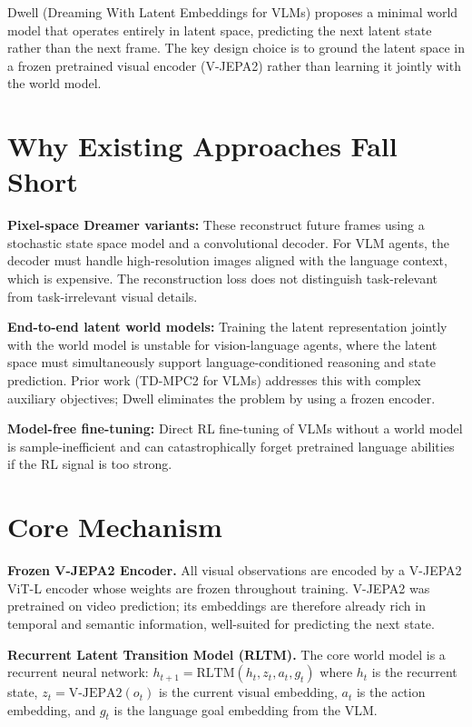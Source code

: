 \documentclass[10pt,twocolumn]{article}
\begin{document}
Dwell (Dreaming With Latent Embeddings for VLMs) proposes a
minimal world model that operates entirely in latent space,
predicting the next latent state rather than the next frame.
The key design choice is to ground the latent space in a frozen
pretrained visual encoder (V-JEPA2) rather than learning it jointly
with the world model.

\section{Why Existing Approaches Fall Short}

\textbf{Pixel-space Dreamer variants:} These reconstruct future
frames using a stochastic state space model and a convolutional
decoder. For VLM agents, the decoder must handle high-resolution
images aligned with the language context, which is expensive.
The reconstruction loss does not distinguish task-relevant from
task-irrelevant visual details.

\textbf{End-to-end latent world models:} Training the latent
representation jointly with the world model is unstable for
vision-language agents, where the latent space must simultaneously
support language-conditioned reasoning and state prediction.
Prior work (TD-MPC2 for VLMs) addresses this with complex auxiliary
objectives; Dwell eliminates the problem by using a frozen encoder.

\textbf{Model-free fine-tuning:} Direct RL fine-tuning of VLMs
without a world model is sample-inefficient and can catastrophically
forget pretrained language abilities if the RL signal is too strong.

\section{Core Mechanism}

\textbf{Frozen V-JEPA2 Encoder.} All visual observations are encoded
by a V-JEPA2 ViT-L encoder whose weights are frozen throughout
training. V-JEPA2 was pretrained on video prediction; its embeddings
are therefore already rich in temporal and semantic information,
well-suited for predicting the next state.

\textbf{Recurrent Latent Transition Model (RLTM).} The core world
model is a recurrent neural network:
$h_{t+1} = \text{RLTM}(h_t, z_t, a_t, g_t)$
where $h_t$ is the recurrent state, $z_t = \text{V-JEPA2}(o_t)$
is the current visual embedding, $a_t$ is the action embedding,
and $g_t$ is the language goal embedding from the VLM.
\end{document}
